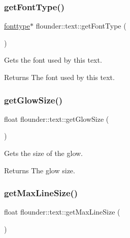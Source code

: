 \subsubsection{\texorpdfstring{get\+Font\+Type()}{getFontType()}}
{\footnotesize\ttfamily \hyperlink{classflounder_1_1fonttype}{fonttype}$\ast$ flounder\+::text\+::get\+Font\+Type (\begin{DoxyParamCaption}{ }\end{DoxyParamCaption})\hspace{0.3cm}{\ttfamily [inline]}}



Gets the font used by this text. 

\begin{DoxyReturn}{Returns}
The font used by this text. 
\end{DoxyReturn}
\mbox{\label{classflounder_1_1text_ad4c9fe99e6285ba919a21cebb278472b}} 
\subsubsection{\texorpdfstring{get\+Glow\+Size()}{getGlowSize()}}
{\footnotesize\ttfamily float flounder\+::text\+::get\+Glow\+Size (\begin{DoxyParamCaption}{ }\end{DoxyParamCaption})}



Gets the size of the glow. 

\begin{DoxyReturn}{Returns}
The glow size. 
\end{DoxyReturn}
\mbox{\label{classflounder_1_1text_a4135aa153773c627b6b83a34b1f2ee1f}} 
\subsubsection{\texorpdfstring{get\+Max\+Line\+Size()}{getMaxLineSize()}}
{\footnotesize\ttfamily float flounder\+::text\+::get\+Max\+Line\+Size (\begin{DoxyParamCaption}{ }\end{DoxyParamCaption})\hspace{0.3cm}{\ttfamily [inline]}}



